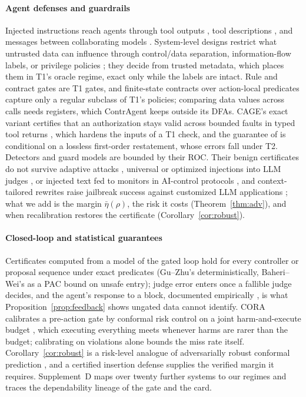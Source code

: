 \paragraph{Agent defenses and guardrails}
Injected instructions reach agents through tool outputs \citep{greshake2023injection}, tool
descriptions \citep{guo2026mcpxkit}, and messages between collaborating models
\citep{yang2026cracks}. System-level designs restrict what untrusted data can influence through control/data
separation, information-flow labels, or privilege policies
\citep{debenedetti2025camel,costa2025fides,progent2025}; they decide from trusted metadata,
which places them in T1's oracle regime, exact only while the labels are intact. Rule and
contract gates \citep{agentspec2026,xiao2026contragent,reddy2026reasonless} are T1 gates,
and finite-state contracts over action-local predicates capture only a regular subclass of
T1's policies; comparing data values across calls needs registers, which ContrAgent \citep{xiao2026contragent} keeps
outside its DFAs. CAGE's exact variant certifies that an
authorization stays valid across bounded faults in typed tool returns
\citep{delattre2026cage}, which hardens the inputs of a T1 check, and the guarantee of \citet{wu2026provably} is
conditional on a lossless first-order restatement, whose errors fall under T2. Detectors
and guard models \citep{inan2023llamaguard,chennabasappa2025llamafirewall,li2025piguard} are
bounded by their ROC. Their benign
certificates do not survive adaptive attacks \citep{nasr2025attacker,zhan2025adaptive}, universal or optimized
injections into LLM judges \citep{raina2024judgerobust,shi2024judgedeceiver}, or injected text fed
to monitors \citep{terekhov2026adaptive} in AI-control protocols \citep{greenblatt2024aicontrol},
and context-tailored rewrites raise jailbreak success against customized LLM applications
\citep{xu2026redagent}; what we add is the margin $\bar\eta(\rho)$, the risk it
costs (Theorem~\ref{thm:adv}), and when recalibration restores the certificate
(Corollary~\ref{cor:robust}).

\paragraph{Closed-loop and statistical guarantees}
Certificates computed from a model of the gated loop \citep{baheri2026controller,gu2026certified}
hold for every controller or proposal sequence under exact predicates (Gu--Zhu's
deterministically, Baheri--Wei's as a PAC bound on unsafe entry); judge error
enters once a fallible judge decides, and the agent's response to a block, documented
empirically \citep{vasudev2026accurate}, is what Proposition~\ref{prop:feedback} shows ungated
data cannot identify. CORA calibrates a pre-action gate by conformal risk control on a joint
harm-and-execute budget \citep{feng2026cora}, which executing everything meets whenever harms
are rarer than the budget; calibrating on violations alone bounds the miss rate itself.
Corollary~\ref{cor:robust} is a risk-level analogue of adversarially robust conformal
prediction \citep{gendler2022robustconformal}, and a certified insertion defense
\citep{kumar2024certifying} supplies the verified margin it requires. Supplement~D maps over
twenty further systems to our regimes and traces the dependability lineage of the gate and the
card.
